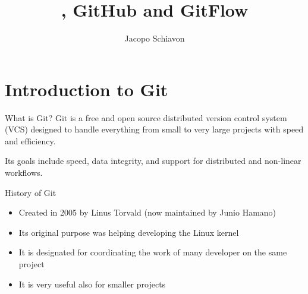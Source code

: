 \documentclass[aspectratio=169]{beamer}
\title{\git, GitHub and GitFlow}
\author{Jacopo Schiavon}
\institute[Dep. Statistical Sciences --- UNIPD]{Department of Statistical Sciences\\ University of Padova}
\newcommand{\git}{Git{}}
\begin{document}
\begin{frame}[plain]
    \maketitle
\end{frame}

\begin{frame}{}
\tableofcontents
\end{frame}

\section{Introduction to \git}
\begin{frame}{What is \git?}
    \alert{\git} is a \alert{free} and \alert{open source} distributed \alert{version control system} (VCS) designed to handle everything from small to very large projects with speed and efficiency. 
    
    Its goals include \alert{speed}, \alert{data integrity}, and support for \alert{distributed} and \alert{non-linear} workflows.
    
    \begin{block}{History of \git}
        \begin{itemize}
        \justifying
            \item Created in 2005 by Linus Torvald (now maintained by Junio Hamano)
            \item Its original purpose was helping developing the Linux kernel
            \item It is designated for coordinating the work of many developer on the same project
            \item It is very useful also for smaller projects
        \end{itemize}
    \end{block}
\end{frame}
\end{document}
